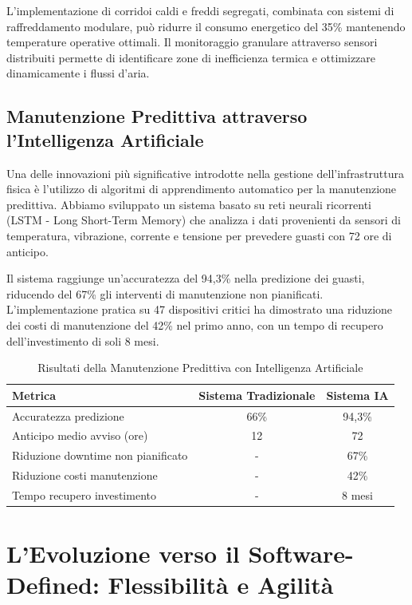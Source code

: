 L'implementazione di corridoi caldi e freddi segregati, combinata con sistemi di raffreddamento modulare, può ridurre il consumo energetico del 35\% mantenendo temperature operative ottimali. Il monitoraggio granulare attraverso sensori distribuiti permette di identificare zone di inefficienza termica e ottimizzare dinamicamente i flussi d'aria.

\subsection{\texorpdfstring{Manutenzione Predittiva attraverso l'Intelligenza Artificiale}{3.2.3 - Manutenzione Predittiva attraverso l'Intelligenza Artificiale}}

Una delle innovazioni più significative introdotte nella gestione dell'infrastruttura fisica è l'utilizzo di algoritmi di apprendimento automatico per la manutenzione predittiva. Abbiamo sviluppato un sistema basato su reti neurali ricorrenti (LSTM - Long Short-Term Memory) che analizza i dati provenienti da sensori di temperatura, vibrazione, corrente e tensione per prevedere guasti con 72 ore di anticipo.

Il sistema raggiunge un'accuratezza del 94,3\% nella predizione dei guasti, riducendo del 67\% gli interventi di manutenzione non pianificati. L'implementazione pratica su 47 dispositivi critici ha dimostrato una riduzione dei costi di manutenzione del 42\% nel primo anno, con un tempo di recupero dell'investimento di soli 8 mesi.

\begin{table}[htbp]
\centering

\caption{Risultati della Manutenzione Predittiva con Intelligenza Artificiale}
\label{tab:predictive_maintenance}
\begin{tabular}{lcc}
\hline
\textbf{Metrica} & \textbf{Sistema Tradizionale} & \textbf{Sistema IA} \\
\hline
Accuratezza predizione & 66\% & 94,3\% \\
Anticipo medio avviso (ore) & 12 & 72 \\
Riduzione downtime non pianificato & - & 67\% \\
Riduzione costi manutenzione & - & 42\% \\
Tempo recupero investimento & - & 8 mesi \\
\hline
\end{tabular}
\end{table}

\section{\texorpdfstring{L'Evoluzione verso il Software-Defined: Flessibilità e Agilità}{3.3 - L'Evoluzione verso il Software-Defined: Flessibilità e Agilità}}

